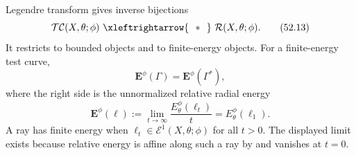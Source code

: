 \begin{theorem}\label{thm:rays-rwn}
Legendre transform gives inverse bijections
\[
 \mathcal{TC}(X,\theta;\phi)
 \ \xleftrightarrow{\ \ *\ \ }\
 \mathcal R(X,\theta;\phi).
\tag{52.13}\label{eq:rays-rwn}
\]
It restricts to bounded objects and to finite-energy objects.  For a
finite-energy test curve,
\[
                       \mathbf E^\phi(\Gamma)
                       =\mathbf E^\phi(\Gamma^*),
\tag{52.14}\label{eq:rays-rwn-energy}
\]
where the right side is the unnormalized relative radial energy
\[
 \mathbf E^\phi(\ell)
 :=\lim_{t\to\infty}\frac{E_\theta^\phi(\ell_t)}{t}
 =E_\theta^\phi(\ell_1).
\]
A ray has finite energy when $\ell_t\in\mathcal E^1(X,\theta;\phi)$
for all $t>0$.  The displayed limit exists because relative energy
is affine along such a ray by \cite[Proposition~4.3.3]{XiaBook}
and vanishes at $t=0$.
\end{theorem}

